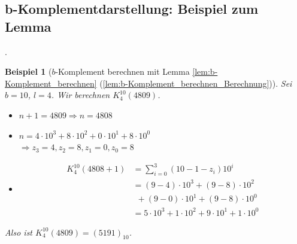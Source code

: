 \documentclass{beamer}
\newtheorem{beispiel}[satz]{Beispiel}
\newcommand{\subsecframe}{\begin{frame}{\insertsectionnumber.\insertsubsectionnumber \ \insertsubsection}}
\begin{document}
    \subsection{b-Komplementdarstellung: Beispiel zum Lemma}

        \subsecframe
            \begin{beispiel}[$b$-Komplement berechnen mit Lemma \ref{lem:b-Komplement_berechnen} (\ref{lem:b-Komplement_berechnen_Berechnung})]
                Sei $b=10$, $l=4$. Wir berechnen $K_4^{10}(4809)$. \\
                \begin{itemize}
                    \item $n+1 = 4809 \Rightarrow n = 4808$
                    \item $n=4 \cdot 10^3 + 8 \cdot 10^2 + 0\cdot 10^1 + 8\cdot 10^0$ \\
                        $\Rightarrow z_3 = 4, z_2 = 8, z_1 = 0, z_0 =8$
                    \item   \begin{align*}
                                K_4^{10}(4808+1) &= \sum_{i=0}^3(10-1-z_i)10^i \\
                                &= (9-4) \cdot 10^3 + (9-8) \cdot 10^2 \\ 
                                &~~+ (9-0) \cdot 10^1 + (9-8) \cdot 10^0 \\
                                &= 5 \cdot 10^3 + 1 \cdot 10^2 + 9 \cdot 10^1 + 1 \cdot 10^0
                            \end{align*}
                \end{itemize}
                Also ist $K_4^{10}(4809) = (5191)_{10}$.
            \end{beispiel}
        \end{frame}
\end{document}

